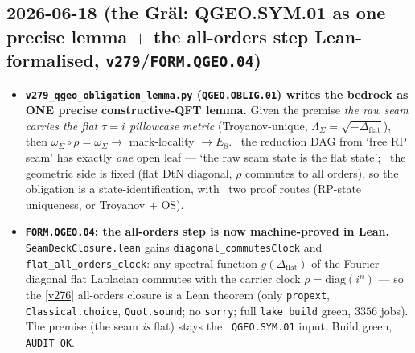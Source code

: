 \subsection*{2026-06-18 (the Gr\"al: QGEO.SYM.01 as one precise lemma $+$ the all-orders step Lean-formalised, \texttt{v279}/\texttt{FORM.QGEO.04})}
\begin{itemize}
\item \textbf{\texttt{v279\_qgeo\_obligation\_lemma.py} (\texttt{QGEO.OBLIG.01}) writes the bedrock as ONE precise
  constructive-QFT lemma.} Given the premise \emph{the raw seam carries the flat $\tau{=}i$ pillowcase metric}
  (Troyanov-unique, $\Lambda_\Sigma{=}\sqrt{-\Delta_{\mathrm{flat}}}$), then $\omega_\Sigma\circ\rho=\omega_\Sigma
  \to$ mark-locality $\to E_8$. \mE\ the reduction DAG from `free RP seam' has exactly \emph{one} open leaf ---
  `the raw seam state is the flat state'; \mE\ the geometric side is fixed (flat DtN diagonal, $\rho$ commutes to
  all orders), so the obligation is a state-identification, with \mC\ two proof routes (RP-state uniqueness, or
  Troyanov $+$ OS).
\item \textbf{\texttt{FORM.QGEO.04}: the all-orders step is now machine-proved in Lean.}
  \texttt{SeamDeckClosure.lean} gains \texttt{diagonal\_commutesClock} and
  \texttt{flat\_all\_orders\_clock}: any spectral function $g(\Delta_{\mathrm{flat}})$ of the Fourier-diagonal
  flat Laplacian commutes with the carrier clock $\rho{=}\mathrm{diag}(i^n)$ --- so the \vref{v276} all-orders
  closure is a Lean theorem (only \texttt{propext}, \texttt{Classical.choice}, \texttt{Quot.sound}; no
  \texttt{sorry}; full \texttt{lake build} green, $3356$ jobs). The premise (the seam \emph{is} flat) stays the
  \mO\ \texttt{QGEO.SYM.01} input. Build green, \texttt{AUDIT OK}.
\end{itemize}

